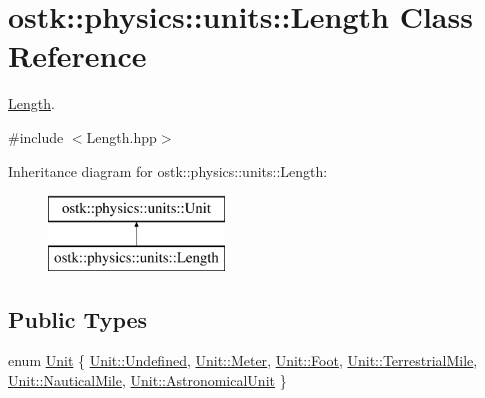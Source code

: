 \hypertarget{classostk_1_1physics_1_1units_1_1_length}{}\section{ostk\+:\+:physics\+:\+:units\+:\+:Length Class Reference}
\label{classostk_1_1physics_1_1units_1_1_length}


\hyperlink{classostk_1_1physics_1_1units_1_1_length}{Length}.  




{\ttfamily \#include $<$Length.\+hpp$>$}

Inheritance diagram for ostk\+:\+:physics\+:\+:units\+:\+:Length\+:\begin{figure}[H]
\begin{center}
\leavevmode
\includegraphics[height=2.000000cm]{classostk_1_1physics_1_1units_1_1_length}
\end{center}
\end{figure}
\subsection*{Public Types}
\begin{DoxyCompactItemize}
\item 
enum \hyperlink{classostk_1_1physics_1_1units_1_1_length_a2664470a7eedf5d45c88861fe69badea}{Unit} \{ \newline
\hyperlink{classostk_1_1physics_1_1units_1_1_length_a2664470a7eedf5d45c88861fe69badeaaec0fc0100c4fc1ce4eea230c3dc10360}{Unit\+::\+Undefined}, 
\hyperlink{classostk_1_1physics_1_1units_1_1_length_a2664470a7eedf5d45c88861fe69badeaa17c9c40b9db5a0983d1075a012c1f90a}{Unit\+::\+Meter}, 
\hyperlink{classostk_1_1physics_1_1units_1_1_length_a2664470a7eedf5d45c88861fe69badeaa129e74dde7b475c8848310e16754c965}{Unit\+::\+Foot}, 
\hyperlink{classostk_1_1physics_1_1units_1_1_length_a2664470a7eedf5d45c88861fe69badeaaf8e05509b5e8ce4f92f380304a29aa87}{Unit\+::\+Terrestrial\+Mile}, 
\newline
\hyperlink{classostk_1_1physics_1_1units_1_1_length_a2664470a7eedf5d45c88861fe69badeaa17728b6a29127fe1e34706ae1d691f42}{Unit\+::\+Nautical\+Mile}, 
\hyperlink{classostk_1_1physics_1_1units_1_1_length_a2664470a7eedf5d45c88861fe69badeaaa05a35804c7e4fff8e02f5a58782f133}{Unit\+::\+Astronomical\+Unit}
 \}
\end{DoxyCompactItemize}
